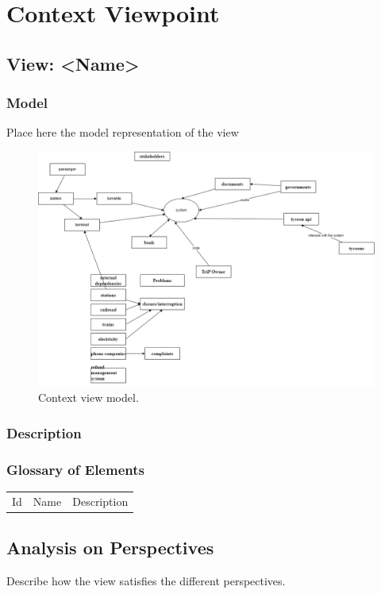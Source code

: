 \section{Context Viewpoint}
\subsection*{View: \textless{}Name\textgreater{}}
\subsubsection*{Model}
Place here the model representation of the view
\begin{figure}[ht]
    \centering
    \includegraphics[width=\textwidth]{drawings/views_draft1/context_view_draft1.png}
    \caption{Context view model.}
    \label{fig:context_view_model}
\end{figure}

\subsubsection*{Description}

\subsubsection*{Glossary of Elements}
\begin{longtable}{lll}
Id & Name & Description \\
\end{longtable}

\subsection*{Analysis on Perspectives}
Describe how the view satisfies the different perspectives. 


